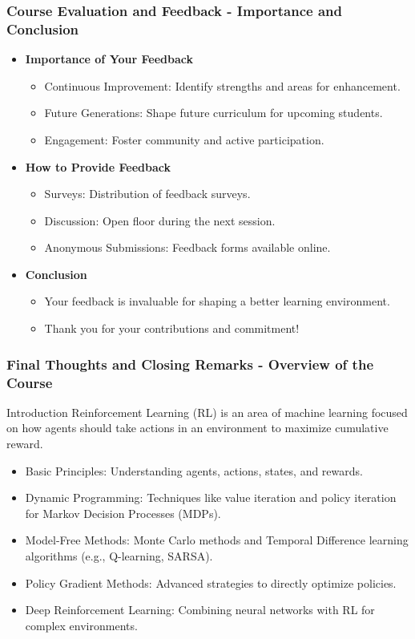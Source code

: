 \documentclass[aspectratio=169]{beamer}
\begin{document}
\begin{frame}[fragile]
    \frametitle{Course Evaluation and Feedback - Importance and Conclusion}
    \begin{itemize}
        \item \textbf{Importance of Your Feedback}
        \begin{itemize}
            \item Continuous Improvement: Identify strengths and areas for enhancement.
            \item Future Generations: Shape future curriculum for upcoming students.
            \item Engagement: Foster community and active participation.
        \end{itemize}
        \item \textbf{How to Provide Feedback}
        \begin{itemize}
            \item Surveys: Distribution of feedback surveys.
            \item Discussion: Open floor during the next session.
            \item Anonymous Submissions: Feedback forms available online.
        \end{itemize}
        \item \textbf{Conclusion}
        \begin{itemize}
            \item Your feedback is invaluable for shaping a better learning environment.
            \item Thank you for your contributions and commitment!
        \end{itemize}
    \end{itemize}
\end{frame}

\begin{frame}[fragile]
    \frametitle{Final Thoughts and Closing Remarks - Overview of the Course}
    \begin{block}{Introduction}
        Reinforcement Learning (RL) is an area of machine learning focused on how agents should take actions in an environment to maximize cumulative reward. 
    \end{block}
    \begin{itemize}
        \item Basic Principles: Understanding agents, actions, states, and rewards.
        \item Dynamic Programming: Techniques like value iteration and policy iteration for Markov Decision Processes (MDPs).
        \item Model-Free Methods: Monte Carlo methods and Temporal Difference learning algorithms (e.g., Q-learning, SARSA).
        \item Policy Gradient Methods: Advanced strategies to directly optimize policies.
        \item Deep Reinforcement Learning: Combining neural networks with RL for complex environments.
    \end{itemize}
\end{frame}
\end{document}
